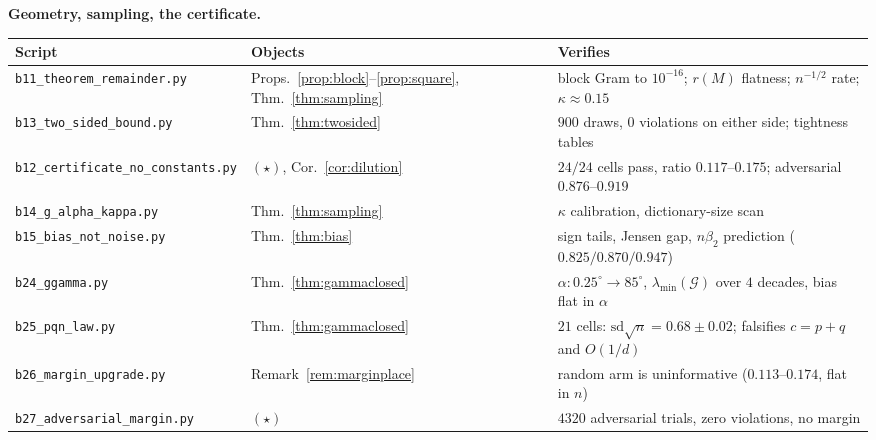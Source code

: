 \documentclass[11pt]{article}
\theoremstyle{remark}
\newcommand{\Gr}{\mathcal{G}}
\begin{document}
\noindent\textbf{Geometry, sampling, the certificate.}
\begin{center}\footnotesize\begin{tabular}{@{}>{\raggedright\arraybackslash}p{5.1cm}%
>{\raggedright\arraybackslash}p{2.5cm}>{\raggedright\arraybackslash}p{5.8cm}@{}}
\toprule Script & Objects & Verifies\\
\midrule
\texttt{b11\_theorem\_remainder.py} & Props.~\ref{prop:block}--\ref{prop:square},
Thm.~\ref{thm:sampling} & block Gram to $10^{-16}$; $r(M)$ flatness; $n^{-1/2}$ rate;
$\kappa\approx0.15$\\
\texttt{b13\_two\_sided\_bound.py} & Thm.~\ref{thm:twosided} & $900$ draws, $0$
violations on either side; tightness tables\\
\texttt{b12\_certificate\_no\_constants.py} & $(\star)$, Cor.~\ref{cor:dilution} &
$24/24$ cells pass, ratio $0.117$--$0.175$; adversarial $0.876$--$0.919$\\
\texttt{b14\_g\_alpha\_kappa.py} & Thm.~\ref{thm:sampling} & $\kappa$ calibration,
dictionary-size scan\\
\texttt{b15\_bias\_not\_noise.py} & Thm.~\ref{thm:bias} & sign tails, Jensen gap, $n\beta_2$
prediction ($0.825/0.870/0.947$)\\
\texttt{b24\_ggamma.py} & Thm.~\ref{thm:gammaclosed} & $\alpha:0.25^\circ\to85^\circ$,
$\lambda_{\min}(\Gr)$ over $4$ decades, bias flat in $\alpha$\\
\texttt{b25\_pqn\_law.py} & Thm.~\ref{thm:gammaclosed} & $21$ cells: $\mathrm{sd}\sqrt
n=0.68\pm0.02$; falsifies $c=p+q$ and $O(1/d)$\\
\texttt{b26\_margin\_upgrade.py} & Remark~\ref{rem:marginplace} & random arm is
uninformative ($0.113$--$0.174$, flat in $n$)\\
\texttt{b27\_adversarial\_margin.py} & $(\star)$ & $4320$ adversarial trials, zero
violations, no margin\\
\bottomrule
\end{tabular}\end{center}
\end{document}
